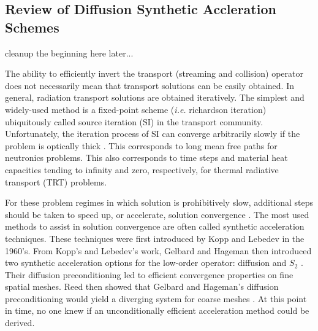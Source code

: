 \subsection{Review of Diffusion Synthetic Accleration Schemes}
\label{sec::DSA_Introduction_History}

cleanup the beginning here later...

The ability to efficiently invert the transport (streaming and collision) operator does not necessarily mean that transport solutions can be easily obtained. In general, radiation transport solutions are obtained iteratively. The simplest and widely-used method is a fixed-point scheme ({\em i.e.} richardson iteration) ubiquitously called source iteration (SI) in the transport community. Unfortunately, the iteration process of SI can converge arbitrarily slowly if the problem is optically thick \cite{ref::adams_larsen_iter_methods}. This corresponds to long mean free paths for neutronics problems. This also corresponds to time steps and material heat capacities tending to infinity and zero, respectively, for thermal radiative transport (TRT) problems.

For these problem regimes in which solution is prohibitively slow, additional steps should be taken to speed up, or accelerate, solution convergence \cite{ref::adams_larsen_iter_methods}. The most used methods to assist in solution convergence are often called synthetic acceleration techniques. These techniques were first introduced by Kopp \cite{kopp1963synthetic} and Lebedev \cite{lebedevI,lebedevII,lebedevIII,lebedevIV,lebedevV,lebedevVI,lebedevVII} in the 1960's. From Kopp's and Lebedev's work, Gelbard and Hageman then introduced two synthetic acceleration options for the low-order operator: diffusion and $S_2$ \cite{gelbard1969synthetic}. Their diffusion preconditioning led to efficient convergence properties on fine spatial meshes. Reed then showed that Gelbard and Hageman's diffusion preconditioning would yield a diverging system for coarse meshes \cite{reed1971effectiveness}. At this point in time, no one knew if an unconditionally efficient acceleration method could be derived.

